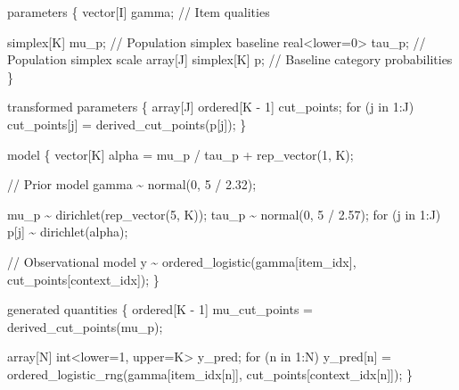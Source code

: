 \documentclass[
  letterpaper,
  DIV=11,
  numbers=noendperiod]{scrartcl}
\newenvironment{Shaded}{\begin{snugshade}}{\end{snugshade}}
\newcommand{\CommentTok}[1]{\textcolor[rgb]{0.37,0.37,0.37}{#1}}
\newcommand{\ControlFlowTok}[1]{\textcolor[rgb]{0.00,0.23,0.31}{#1}}
\newcommand{\DataTypeTok}[1]{\textcolor[rgb]{0.68,0.00,0.00}{#1}}
\newcommand{\DecValTok}[1]{\textcolor[rgb]{0.68,0.00,0.00}{#1}}
\newcommand{\FloatTok}[1]{\textcolor[rgb]{0.68,0.00,0.00}{#1}}
\newcommand{\KeywordTok}[1]{\textcolor[rgb]{0.00,0.23,0.31}{#1}}
\newcommand{\NormalTok}[1]{\textcolor[rgb]{0.00,0.23,0.31}{#1}}
\begin{document}
\begin{codelisting}
\begin{Shaded}
\begin{Highlighting}[]
\KeywordTok{parameters}\NormalTok{ \{}
  \DataTypeTok{vector}\NormalTok{[I] gamma; }\CommentTok{// Item qualities}

  \DataTypeTok{simplex}\NormalTok{[K] mu\_p;       }\CommentTok{// Population simplex baseline}
  \DataTypeTok{real}\NormalTok{\textless{}}\KeywordTok{lower}\NormalTok{=}\DecValTok{0}\NormalTok{\textgreater{} tau\_p;   }\CommentTok{// Population simplex scale}
  \DataTypeTok{array}\NormalTok{[J] }\DataTypeTok{simplex}\NormalTok{[K] p; }\CommentTok{// Baseline category probabilities}
\NormalTok{\}}

\KeywordTok{transformed parameters}\NormalTok{ \{}
  \DataTypeTok{array}\NormalTok{[J] }\DataTypeTok{ordered}\NormalTok{[K {-} }\DecValTok{1}\NormalTok{] cut\_points;}
  \ControlFlowTok{for}\NormalTok{ (j }\ControlFlowTok{in} \DecValTok{1}\NormalTok{:J)}
\NormalTok{    cut\_points[j] = derived\_cut\_points(p[j]);}
\NormalTok{\}}

\KeywordTok{model}\NormalTok{ \{}
  \DataTypeTok{vector}\NormalTok{[K] alpha = mu\_p / tau\_p + rep\_vector(}\DecValTok{1}\NormalTok{, K);}

  \CommentTok{// Prior model}
\NormalTok{  gamma \textasciitilde{} normal(}\DecValTok{0}\NormalTok{, }\DecValTok{5}\NormalTok{ / }\FloatTok{2.32}\NormalTok{);}

\NormalTok{  mu\_p \textasciitilde{} dirichlet(rep\_vector(}\DecValTok{5}\NormalTok{, K));}
\NormalTok{  tau\_p \textasciitilde{} normal(}\DecValTok{0}\NormalTok{, }\DecValTok{5}\NormalTok{ / }\FloatTok{2.57}\NormalTok{);}
  \ControlFlowTok{for}\NormalTok{ (j }\ControlFlowTok{in} \DecValTok{1}\NormalTok{:J)}
\NormalTok{    p[j] \textasciitilde{} dirichlet(alpha);}

  \CommentTok{// Observational model}
\NormalTok{  y \textasciitilde{} ordered\_logistic(gamma[item\_idx], cut\_points[context\_idx]);}
\NormalTok{\}}

\KeywordTok{generated quantities}\NormalTok{ \{}
  \DataTypeTok{ordered}\NormalTok{[K {-} }\DecValTok{1}\NormalTok{] mu\_cut\_points = derived\_cut\_points(mu\_p);}

  \DataTypeTok{array}\NormalTok{[N] }\DataTypeTok{int}\NormalTok{\textless{}}\KeywordTok{lower}\NormalTok{=}\DecValTok{1}\NormalTok{, }\KeywordTok{upper}\NormalTok{=K\textgreater{} y\_pred;}
  \ControlFlowTok{for}\NormalTok{ (n }\ControlFlowTok{in} \DecValTok{1}\NormalTok{:N)}
\NormalTok{    y\_pred[n] = ordered\_logistic\_rng(gamma[item\_idx[n]],}
\NormalTok{                                     cut\_points[context\_idx[n]]);}
\NormalTok{\}}
\end{Highlighting}
\end{Shaded}

\end{codelisting}
\end{document}
